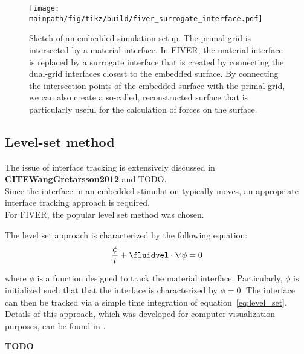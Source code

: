 \documentclass[../main.tex]{subfiles}
\begin{document}
\begin{figure}[h!]
	\begin{center}
        \texttt{[image: \\mainpath/fig/tikz/build/fiver\_surrogate\_interface.pdf]}
        \caption[FIVER setup]{Sketch of an embedded simulation setup. The primal grid is intersected by a material interface. In \ac{FIVER}, the material interface is replaced by a surrogate interface that is created by connecting the dual-grid interfaces closest to the embedded surface. By connecting the intersection points of the embedded surface with the primal grid, we can also create a so-called, reconstructed surface that is particularly useful for the calculation of forces on the surface.}
		\label{fig:FIVER_intersection}
    \end{center}
\end{figure}


\subsection{Level-set method}\label{sec:interface_tracking}

The issue of interface tracking is extensively discussed in \textbf{CITEWangGretarsson2012} and TODO.\\

Since the interface in an embedded stimulation typically moves, an appropriate interface tracking approach is required.\\
For \ac{FIVER}, the popular level set method \cite{Sethian1999} was chosen.

The level set approach is characterized by the following equation:
\begin{align}\label{eq:level_set}
\frac{\phi}{t}+\fluidvel\cdot\nabla\phi=0
\end{align}

where $\phi$ is a function designed to track the material interface. Particularly, $\phi$ is initialized such that that the interface is characterized by $\phi=0$. The interface can then be tracked via a simple time integration of equation~\eqref{eq:level_set}.
Details of this approach, which was developed for computer visualization purposes, can be found in \cite{Sethian1999}.

\textbf{TODO}
\end{document}
